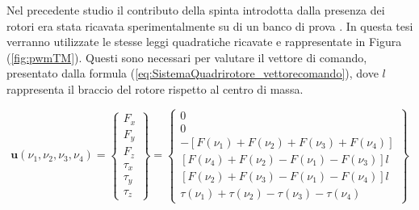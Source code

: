 Nel precedente studio il contributo della spinta introdotta dalla presenza dei rotori era stata ricavata sperimentalmente su di un banco di prova \cite{DesTestCarm}. In questa tesi verranno utilizzate le stesse leggi quadratiche ricavate e rappresentate in Figura (\ref{fig:pwmTM}). Questi sono necessari per valutare il vettore di comando, presentato dalla formula (\ref{eq:SistemaQuadrirotore_vettorecomando}), dove $l$ rappresenta il braccio del rotore rispetto al centro di massa.

\begin{equation}\label{eq:SistemaQuadrirotore_vettorecomando}
	\mathbf{u}(\nu_1,\nu_2,\nu_3,\nu_4) = 
	\begin{Bmatrix}
		F_x \\ F_y \\ F_z \\ \tau_x \\ \tau_y \\ \tau_z
	\end{Bmatrix}
	=\begin{Bmatrix}
		0 \\ 0 \\
		-\left[F(\nu_1)+F(\nu_2)+F(\nu_3)+F(\nu_4)\right] \\
		\left[F(\nu_4)+F(\nu_2)-F(\nu_1)-F(\nu_3)\right ] l \\
		\left[F(\nu_2)+F(\nu_3)-F(\nu_1)-F(\nu_4)\right] l \\
		\tau(\nu_1)+\tau(\nu_2)-\tau(\nu_3)-\tau(\nu_4)
	\end{Bmatrix}
\end{equation} 

